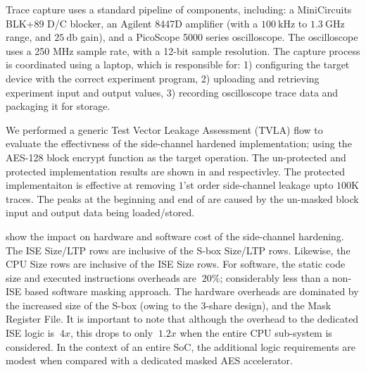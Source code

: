 Trace capture uses a standard pipeline of components, including:
a MiniCircuits BLK+89 D/C blocker,
an Agilent 8447D amplifier (with a $\SI{100}{\kilo\hertz}$ to $\SI{1.3}{\giga\hertz}$ range, and $\SI{25}{\decibel}$ gain),
and
a  PicoScope 5000 series oscilloscope.
The oscilloscope uses a 250 MHz sample rate, with a 12-bit sample resolution.
The capture process is coordinated using a laptop, which is responsible for:
1) configuring the target device with the correct experiment program,
2) uploading and retrieving experiment input and output values,
3) recording oscilloscope trace data and packaging it for storage.

We performed a generic Test Vector Leakage Assessment (TVLA) flow to evaluate
the effectivness of the side-channel hardened implementation;
using the AES-128 block encrypt function as the target operation.
The un-protected and protected implementation results are shown in
 and
 respectivley.
The protected implementaiton is effective at removing $1$'st
order side-channel leakage upto $100$K traces.
The peaks at the beginning and end of 
are caused by the un-masked block input and output data being loaded/stored.

 show the impact on hardware and software cost
of the side-channel hardening.
The ISE Size/LTP rows are inclusive of the S-box Size/LTP rows.
Likewise, the CPU Size rows are inclusive of the ISE Size rows.
For software, the static code size and executed instructions overheads are $~20\%$; considerably less than a non-ISE based software masking approach.
The hardware overheads are dominated by the increased size of the
S-box (owing to the 3-share design), and the Mask Register File.
It is important to note that although the overhead to the dedicated
ISE logic is $~4x$, this drops to only $~1.2x$ when the entire
CPU sub-system is considered.
In the context of an entire SoC, the additional logic requirements
are modest when compared with a dedicated masked AES accelerator.

